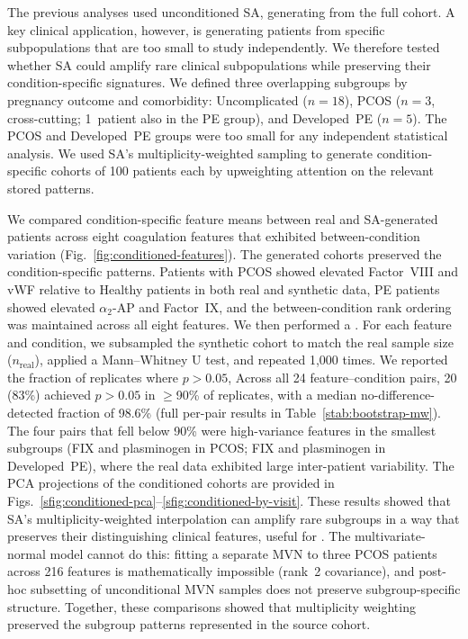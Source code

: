 The previous analyses used unconditioned SA, generating from the full cohort. A key
clinical application, however, is generating patients from specific subpopulations
that are too small to study independently. We therefore tested whether SA could
amplify rare clinical subpopulations while preserving their
condition-specific signatures. We defined three overlapping subgroups by pregnancy
outcome and comorbidity: Uncomplicated ($n{=}18$), PCOS ($n{=}3$, cross-cutting;
1~patient also in the PE group), and Developed~PE ($n{=}5$). The PCOS and
Developed~PE groups were too small for any independent statistical analysis. We used
SA's multiplicity-weighted sampling to generate condition-specific cohorts of 100
patients each by upweighting attention on the relevant stored patterns.

We compared condition-specific feature means between real and SA-generated patients
across eight coagulation features that exhibited between-condition variation
(Fig.~\ref{fig:conditioned-features}). The generated cohorts preserved the
condition-specific patterns. Patients with PCOS showed elevated Factor~VIII and vWF
relative to Healthy patients in both real and synthetic data, PE patients showed
elevated $\alpha_2$-AP and Factor~IX, and the between-condition rank ordering was
maintained across all eight features. We then performed a . For each feature and condition, we subsampled the
synthetic cohort to match the real sample size ($n_{\text{real}}$), applied a
Mann--Whitney U test, and repeated 1,000 times. We reported the fraction of
replicates where $p > 0.05$,  Across all 24 feature--condition pairs, 20 (83\%) achieved
$p > 0.05$ in $\geq$90\% of replicates, with a median
no-difference-detected fraction of 98.6\% (full per-pair results in
Table~\ref{stab:bootstrap-mw}). The four pairs that fell below 90\% were
high-variance features in the smallest subgroups (FIX and plasminogen in PCOS;
FIX and plasminogen in Developed~PE), where the real data exhibited large
inter-patient variability.  The PCA projections of the conditioned cohorts are provided in
Figs.~\ref{sfig:conditioned-pca}--\ref{sfig:conditioned-by-visit}. These results showed that SA's multiplicity-weighted
interpolation can amplify rare subgroups in a way that preserves their distinguishing
clinical features, useful for . The multivariate-normal model cannot do this:
fitting a separate MVN to three PCOS patients across 216 features is mathematically
impossible (rank~2 covariance), and post-hoc subsetting of unconditional MVN samples
does not preserve subgroup-specific structure. Together, these comparisons showed that
multiplicity weighting preserved the subgroup patterns represented in the source cohort.

